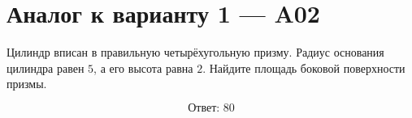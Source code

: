 \documentclass[12pt,a4paper]{article}
\begin{document}
\section*{Аналог к варианту 1 — A02}

Цилиндр вписан в правильную четырёхугольную призму. Радиус основания цилиндра равен \(5\), а его высота равна \(2\). Найдите площадь боковой поверхности призмы.

\begin{center}
\end{center}

\[
\boxed{\text{Ответ: }80}
\]
\end{document}
